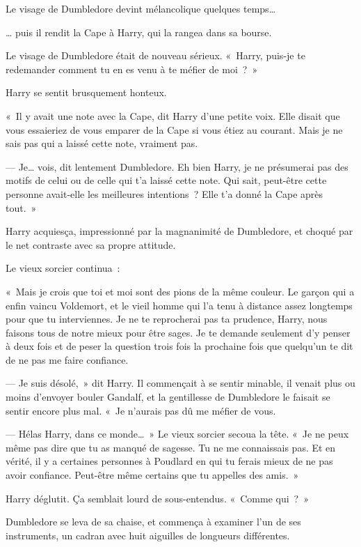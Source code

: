 Le visage de Dumbledore devint mélancolique quelques temps…

… puis il rendit la Cape à Harry, qui la rangea dans sa bourse.

Le visage de Dumbledore était de nouveau sérieux.
«~Harry, puis-je te redemander comment tu en es venu à te méfier de moi~?~»

Harry se sentit brusquement honteux.

«~Il y avait une note avec la Cape, dit Harry d'une petite voix.
Elle disait que vous essaieriez de vous emparer de la Cape si vous étiez au courant.
Mais je ne sais pas qui a laissé cette note, vraiment pas.

--- Je… vois, dit lentement Dumbledore.
Eh bien Harry, je ne présumerai pas des motifs de celui ou de celle qui t'a laissé cette note.
Qui sait, peut-être cette personne avait-elle les meilleures intentions~?
Elle t'a donné la Cape après tout.~»

Harry acquiesça, impressionné par la magnanimité de Dumbledore, et choqué par le net contraste avec sa propre attitude.

Le vieux sorcier continua~:

«~Mais je crois que toi et moi sont des pions de la même couleur.
Le garçon qui a enfin vaincu Voldemort, et le vieil homme qui l'a tenu à distance assez longtemps pour que tu interviennes.
Je ne te reprocherai pas ta prudence, Harry, nous faisons tous de notre mieux pour être sages.
Je te demande seulement d'y penser à deux fois et de peser la question trois fois la prochaine fois que quelqu'un te dit de ne pas me faire confiance.

--- Je suis désolé,~» dit Harry.
Il commençait à se sentir minable, il venait plus ou moins d'envoyer bouler Gandalf, et la gentillesse de Dumbledore le faisait se sentir encore plus mal.
«~Je n'aurais pas dû me méfier de vous.

--- Hélas Harry, dans ce monde…~»
Le vieux sorcier secoua la tête.
«~Je ne peux même pas dire que tu as manqué de sagesse.
Tu ne me connaissais pas.
Et en vérité, il y a certaines personnes à Poudlard en qui tu ferais mieux de ne pas avoir confiance.
Peut-être même certains que tu appelles des amis.~»

Harry déglutit.
Ça semblait lourd de sous-entendus.
«~Comme qui~?~»

Dumbledore se leva de sa chaise, et commença à examiner l'un de ses instruments, un cadran avec huit aiguilles de longueurs différentes.

